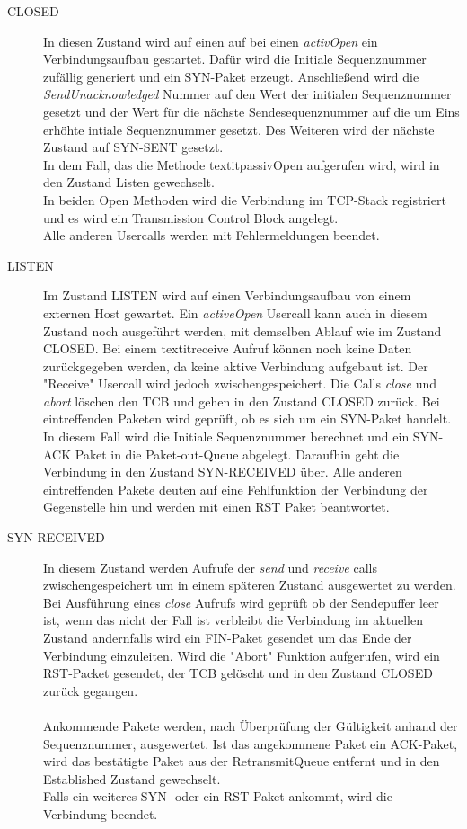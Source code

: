 \begin{description}
\item[CLOSED]
In diesen Zustand wird auf einen auf bei einen \textit{activOpen} ein Verbindungsaufbau gestartet. Dafür wird die Initiale Sequenznummer zufällig generiert und ein SYN-Paket erzeugt. Anschließend wird die \textit{SendUnacknowledged} Nummer auf den Wert der initialen Sequenznummer gesetzt und der Wert für die nächste Sendesequenznummer auf die um Eins erhöhte intiale Sequenznummer gesetzt. Des Weiteren wird der nächste Zustand auf SYN-SENT gesetzt. \\
In dem Fall, das die Methode textit{passivOpen} aufgerufen wird, wird in den Zustand Listen gewechselt. \\
In beiden Open Methoden wird die Verbindung im TCP-Stack registriert und es wird ein Transmission Control Block angelegt.\\
Alle anderen Usercalls werden mit Fehlermeldungen beendet. 

\item[LISTEN]
Im Zustand LISTEN wird auf einen Verbindungsaufbau von einem externen Host gewartet. Ein \textit{activeOpen} Usercall kann auch in diesem Zustand noch ausgeführt werden, mit demselben Ablauf wie im Zustand CLOSED. Bei einem textit{receive} Aufruf können noch keine Daten zurückgegeben werden, da keine aktive Verbindung aufgebaut ist. Der "Receive" Usercall wird jedoch zwischengespeichert. 
Die Calls \textit{close} und \textit{abort} löschen den TCB und gehen in den Zustand CLOSED zurück.
Bei eintreffenden Paketen wird geprüft, ob es sich um ein SYN-Paket handelt. In diesem Fall wird die Initiale Sequenznummer berechnet und ein SYN-ACK Paket in die Paket-out-Queue abgelegt. Daraufhin geht die Verbindung in den Zustand SYN-RECEIVED über. Alle anderen eintreffenden Pakete deuten auf eine Fehlfunktion der Verbindung der Gegenstelle hin und werden mit einen RST Paket beantwortet. 


\item[SYN-RECEIVED]
In diesem Zustand werden Aufrufe der \textit{send} und \textit{receive} calls zwischengespeichert um in einem späteren Zustand ausgewertet zu werden. 
Bei Ausführung eines \textit{close} Aufrufs wird geprüft ob der Sendepuffer leer ist, wenn das nicht der Fall ist verbleibt die Verbindung im aktuellen Zustand andernfalls wird ein FIN-Paket gesendet um das Ende der Verbindung einzuleiten. 
Wird die "{}Abort"{} Funktion aufgerufen, wird ein RST-Packet gesendet, der TCB gelöscht und in den Zustand CLOSED zurück gegangen.\\\\
Ankommende Pakete werden, nach Überprüfung der Gültigkeit anhand der Sequenznummer, ausgewertet. Ist das angekommene Paket ein ACK-Paket, wird das bestätigte Paket aus der RetransmitQueue entfernt und in den Established Zustand gewechselt. \\ Falls ein weiteres SYN- oder ein RST-Paket ankommt, wird die Verbindung beendet. 


\end{description}
